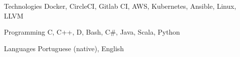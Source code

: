 

\begin{cvskills}

  \cvskill
    {Technologies} %
    {Docker, CircleCI, Gitlab CI, AWS, Kubernetes, Ansible, Linux, LLVM} %

  \cvskill
    {Programming} %
    {C, C++, D, Bash, C\#, Java, Scala, Python} %

  \cvskill
    {Languages} %
    {Portuguese (native), English} %

\end{cvskills}
